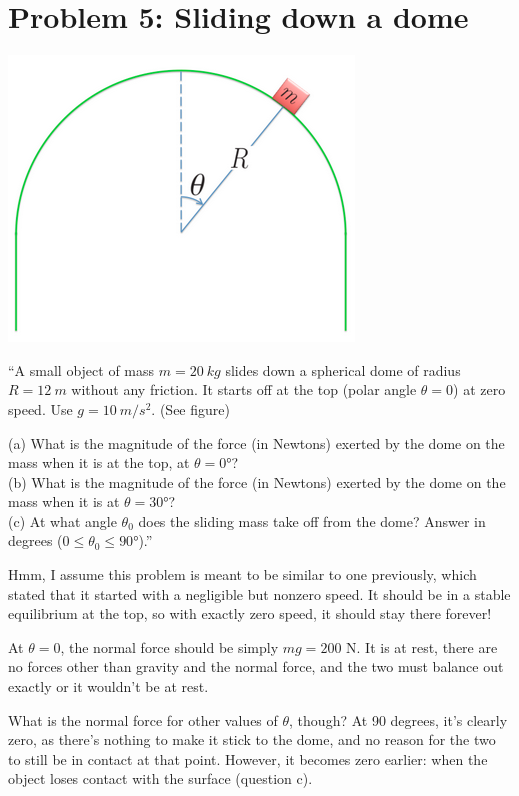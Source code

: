 \documentclass[8.01x]{subfiles}
\begin{document}
\section{Problem 5: Sliding down a dome}

\begin{center}
\includegraphics[scale=0.8]{Graphics/midterm2p5}
\end{center}

``A small object of mass $m = \SI{20}{kg}$ slides down a spherical dome of radius $R = \SI{12}{m}$ without any friction. It starts off at the top (polar angle $\theta = 0$) at zero speed. Use $g = \SI{10}{m/s^2}$. (See figure)

(a) What is the magnitude of the force (in Newtons) exerted by the dome on the mass when it is at the top, at $\theta = \ang{0}$?\\
(b) What is the magnitude of the force (in Newtons) exerted by the dome on the mass when it is at $\theta = \ang{30}$?\\
(c) At what angle $\theta_0$ does the sliding mass take off from the dome? Answer in degrees ($0 \le \theta_0 \le \ang{90}$).''

Hmm, I assume this problem is meant to be similar to one previously, which stated that it started with a negligible but nonzero speed. It should be in a stable equilibrium at the top, so with exactly zero speed, it should stay there forever!

At $\theta = 0$, the normal force should be simply $m g = 200$ N. It is at rest, there are no forces other than gravity and the normal force, and the two must balance out exactly or it wouldn't be at rest.

What is the normal force for other values of $\theta$, though? At 90 degrees, it's clearly zero, as there's nothing to make it stick to the dome, and no reason for the two to still be in contact at that point. However, it becomes zero earlier: when the object loses contact with the surface (question c).
\end{document}
